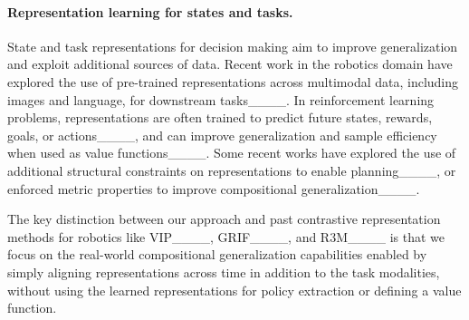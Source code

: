\paragraph{Representation learning for states and tasks.}State and task representations for decision making aim to improve generalization and exploit additional sources of data.
Recent work in the robotics domain have explored the use of pre-trained representations across multimodal data, including images and language, for downstream tasks____.
In reinforcement learning problems, representations are often trained to predict future states, rewards, goals, or actions____, and can improve generalization and sample efficiency when used as value functions____.
Some recent works have explored the use of additional structural constraints on representations to enable planning____, or enforced metric properties to improve compositional generalization____.

The key distinction between our approach and past contrastive representation methods for robotics like VIP____, GRIF____, and R3M____ is that we focus on the real-world compositional generalization capabilities enabled by simply aligning representations across time in addition to the task modalities, without using the learned representations for policy extraction or defining a value function.